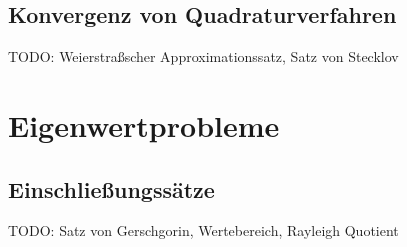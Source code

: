 \subsection{Konvergenz von Quadraturverfahren}

TODO: Weierstraßscher Approximationssatz, Satz von Stecklov

\section{Eigenwertprobleme}

\subsection{Einschließungssätze}

TODO: Satz von Gerschgorin, Wertebereich, Rayleigh Quotient
